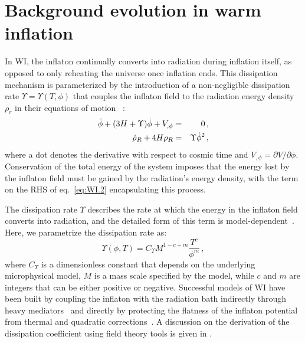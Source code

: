 \documentclass[a4paper,11pt]{article}
\begin{document}
\section{Background evolution in warm inflation
\label{sec:background_ev}}

In WI, the inflaton continually converts into radiation during inflation itself, as opposed to only reheating the universe once inflation ends. This dissipation mechanism is parameterized by the introduction of a non-negligible dissipation rate $\Upsilon = \Upsilon(T,\phi)$ that couples the inflaton field to the radiation energy density $\rho_r$ in their equations of motion ~\cite{Berera:1995wh, Berera:1995ie}:
\begin{eqnarray}
    \Ddot{\phi}+(3H+\Upsilon)\dot{\phi}+V_{,\phi} &=& 0\,,\label{eq:WI.1}\\
    \Dot{\rho}_R+4H\rho_R &=& \Upsilon \Dot{\phi}^2\,,  \label{eq:WI.2}
\end{eqnarray}
where a dot denotes the derivative with respect to cosmic time and $V_{,\phi}=\partial V/\partial \phi$. Conservation of the total energy of the system imposes that the energy lost by the inflaton field must be gained by the radiation's energy density, with the term on the RHS of eq.~\eqref{eq:WI.2} encapsulating this process.

The dissipation rate $\Upsilon$ describes the rate at which the energy in the inflaton field converts into radiation, and the detailed form of this term is model-dependent~\cite{Berera:1998gx, Yokoyama:1998ju}. Here, we parametrize the dissipation rate as:
\begin{equation}
    \Upsilon(\phi, T)=C_\Upsilon M^{1-c+m} \frac{T^c}{\phi^m}\,,
    \label{eq:Upsilon}
\end{equation}
where $C_\Upsilon$ is a dimensionless constant that depends on the underlying microphysical model, $M$ is a mass scale specified by the model, while $c$ and $m$ are integers that can be either positive or negative. Successful models of WI have been built by coupling the inflaton with the radiation bath indirectly through heavy mediators~\cite{Berera:2002sp, Moss:2006gt, Berera:2008ar} and directly by protecting the flatness of the inflaton potential from thermal and quadratic corrections~\cite{Bastero-Gil:2016qru, Bastero-Gil:2019gao, Berghaus:2019whh}. A discussion on the derivation of the dissipation coefficient using field theory tools is given in \cite{Bastero-Gil:2010dgy}.
\end{document}
